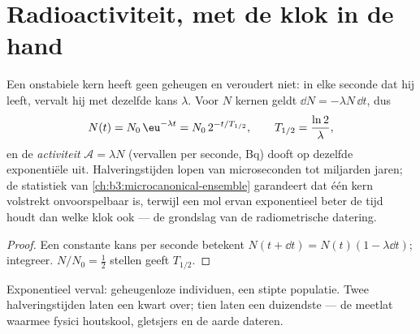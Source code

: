 \section{Radioactiviteit, met de klok in de hand}

\begin{theorem}[De vervalwet]\label{thm:b3:nuclear-physics:decay}
Een onstabiele kern heeft geen geheugen en veroudert niet: in elke seconde dat hij
leeft, vervalt hij met dezelfde kans $\lambda$. Voor $N$
kernen geldt $\dd N = -\lambda N\,\dd t$, dus
\[
N(t) = N_0\,\eu^{-\lambda t} = N_0\,2^{-t/T_{1/2}} ,
\qquad T_{1/2} = \frac{\ln2}{\lambda} ,
\]
en de \emph{activiteit} $\mathcal A = \lambda N$ (vervallen per
seconde, \unit{Bq}) dooft op dezelfde exponentiële uit. Halveringstijden lopen
van microseconden tot miljarden jaren; de statistiek van
\cref{ch:b3:microcanonical-ensemble} garandeert dat één
kern volstrekt onvoorspelbaar is, terwijl een mol ervan
exponentieel beter de tijd houdt dan welke klok ook --- de grondslag van de
radiometrische datering.
\end{theorem}

\begin{proof}
Een constante kans per seconde betekent $N(t + \dd t) = N(t)(1 -
\lambda\dd t)$; integreer. $N/N_0 = \tfrac12$ stellen geeft
$T_{1/2}$.
\end{proof}

\begin{omfigure}

{\small Exponentieel verval: geheugenloze individuen, een stipte
populatie. Twee halveringstijden laten een kwart over; tien laten een
duizendste --- de meetlat waarmee fysici houtskool, gletsjers
en de aarde dateren.}
\end{omfigure}


